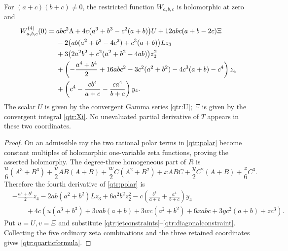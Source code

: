 \begin{theorem}\label{qtr:quartic}
For \((a+c)(b+c)\ne0\), the restricted function \(W_{a,b,c}\)
is holomorphic at zero and
\begin{align}
 W_{a,b,c}^{(4)}(0)={}&
 abc^2\Lambda
 +4c\bigl(a^3+b^3-c^2(a+b)\bigr)U
 +12abc(a+b-2c)\Xi\notag\\
 &-2\bigl(ab(a^2+b^2-4c^2)+c^3(a+b)\bigr)Lz_3\notag\\
 &+3\bigl(2a^2b^2+c^2(a^2+b^2-4ab)\bigr)z_2^2\notag\\
 &+\left(-\frac{a^4+b^4}{2}+16abc^2
        -3c^2(a^2+b^2)-4c^3(a+b)-c^4\right)z_4\notag\\
 &+\left(c^4-\frac{cb^4}{a+c}-\frac{ca^4}{b+c}\right)y_4.
 \label{qtr:quarticformula}
\end{align}
The scalar \(U\) is given by the convergent Gamma series
\eqref{qtr:U}; \(\Xi\) is given by the convergent integral
\eqref{qtr:Xi}. No unevaluated partial derivative of \(T\)
appears in these two coordinates.
\end{theorem}

\begin{proof}
On an admissible ray the two rational polar terms in
\eqref{qtr:polar} become constant multiples of holomorphic
one-variable zeta functions, proving the asserted holomorphy.
The degree-three homogeneous part of \(R\) is
\[
 \frac{u}{6}(A^3+B^3)+\frac{v}{2}AB(A+B)
 +\frac{w}{2}C(A^2+B^2)+xABC
 +\frac{y}{2}C^2(A+B)+\frac{z}{6}C^3.
\]
Therefore the fourth derivative of \eqref{qtr:polar} is
\begin{align*}
 &-\frac{a^4+b^4}{2}z_4
 -2ab(a^2+b^2)Lz_3+6a^2b^2z_2^2
 -c\left(\frac{b^4}{a+c}+\frac{a^4}{b+c}\right)y_4\\
 &\qquad+4c\left(u(a^3+b^3)+3vab(a+b)
 +3wc(a^2+b^2)+6xabc+3yc^2(a+b)+zc^3\right).
\end{align*}
Put \(u=U,v=\Xi\) and substitute
\eqref{qtr:jetconstraints}--\eqref{qtr:diagonalconstraint}.
Collecting the five ordinary zeta combinations and the three
retained coordinates gives \eqref{qtr:quarticformula}.
\end{proof}

